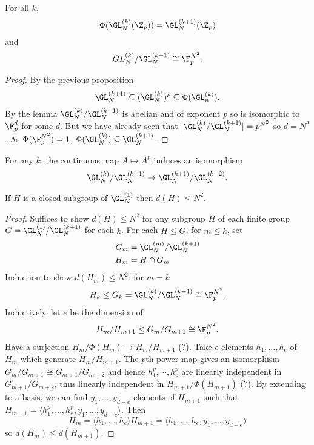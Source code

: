 \documentclass[a4paper]{article}
\begin{document}
\begin{proposition}
  For all \(k\),
  \[
    \Phi(\GL_N^{(k)}(\Z_p)) = \GL_N^{(k + 1)}(\Z_p)
  \]
  and
  \[
    GL_N^{(k)}/\GL_N^{(k + 1)} \cong \F_p^{N^2}.
  \]
\end{proposition}

\begin{proof}
  By the previous proposition
  \[
    \GL_N^{(k + 1)} \subseteq (\GL_N^{(k)})^p \subseteq \Phi(\GL_n^{(k)}).
  \]
  By the lemma \(\GL_N^{(k)}/\GL_N^{(k + 1)}\) is abelian and of exponent \(p\) so is isomorphic to \(\F_p^d\) for some \(d\). But we have already seen that \(|\GL_N^{(k)}/\GL_N^{(k + 1)}| = p^{N^2}\) so \(d = N^2\). As \(\Phi(\F_p^{N^2}) = 1\), \(\Phi(\GL_N^{(k)}) \subseteq \GL_N^{(k + 1)}\).
\end{proof}

\begin{corollary}
  For any \(k\), the continuous map \(A \mapsto A^p\) induces an isomorphism
  \[
    \GL_N^{(k)}/\GL_N^{(k + 1)} \to \GL_N^{(k + 1)}/\GL_N^{(k + 2)}.
  \]
\end{corollary}

\begin{theorem}
  If \(H\) is a closed subgroup of \(\GL_N^{(1)}\) then \(d(H) \leq N^2\).
\end{theorem}

\begin{proof}
  Suffices to show \(d(H) \leq N^2\) for any subgroup \(H\) of each finite group \(G = \GL_N^{(1)}/\GL_N^{(k + 1)}\) for each \(k\). For each \(H \leq G\), for \(m \leq k\), set
  \begin{align*}
    G_m &= \GL_N^{(m)}/\GL_N^{(k + 1)} \\
    H_m &= H \cap G_m
  \end{align*}
  Induction to show \(d(H_m) \leq N^2\): for \(m = k\)
  \[
    H_k \leq G_k = \GL_N^{(k)}/\GL_N^{(k + 1)} \cong \F^{N^2}_p.
  \]
  Inductively, let \(e\) be the dimension of
  \[
    H_m/H_{m + 1} \leq G_m/G_{m + 1} \cong \F_p^{N^2}.
  \]
  Have a surjection \(H_m/\Phi(H_m) \to H_m/H_{m + 1}\) (?). Take \(e\) elements \(h_1, \dots, h_e\) of \(H_m\) which generate \(H_m/H_{m + 1}\). The \(p\)th-power map gives an isomorphism \(G_m/G_{m + 1} \cong G_{m + 1}/G_{m + 2}\) and hence \(h_1^p, \cdots, h_e^p\) are linearly independent in \(G_{m + 1}/G_{m + 2}\), thus linearly independent in \(H_{m + 1}/\Phi(H_{m + 1})\) (?). By extending to a basis, we can find \(y_1, \dots, y_{d - e}\) elements of \(H_{m + 1}\) such that \(H_{m + 1} = \langle h_1^p, \dots, h_e^p, y_1, \dots, y_{d - e} \rangle\). Then
  \[
    H_m = \langle h_1, \dots, h_e \rangle H_{m + 1} = \langle h_1, \dots, h_e, y_1, \dots, y_{d - e} \rangle
  \]
  so \(d(H_m) \leq d(H_{m + 1})\).
\end{proof}
\end{document}
